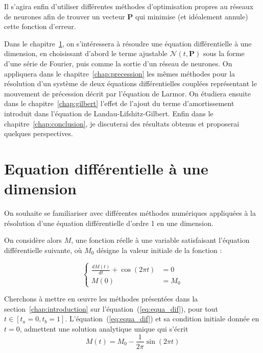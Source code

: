 \documentclass[12pt]{report}
\begin{document}
Il s'agira enfin d'utiliser différentes méthodes d'optimisation propres au réseaux de neurones afin de trouver un vecteur $\bm P$ qui minimise (et idéalement annule) cette fonction d'erreur.

Dans le chapitre~\ref{chap:ode_1}, on s'intéressera à résoudre une équation différentielle à une dimension, en choisissant d'abord le terme ajustable $\mathcal{N}(t,\bm{P})$ sous la forme d'une série de Fourier, puis comme la sortie d'un réseau de neurones.
On appliquera dans le chapitre~\ref{chap:precession} les mêmes méthodes pour la résolution d'un système de deux équations différentielles couplées représentant le mouvement de précession décrit par l'équation de Larmor.
On étudiera ensuite dans le chapitre~\ref{chap:gilbert} l'effet de l'ajout du terme d'amortissement introduit dans l'équation de Landau-Lifshitz-Gilbert.
Enfin dans le chapitre~\ref{chap:conclusion}, je discuterai des résultats obtenus et proposerai quelques perspectives.

\chapter{Equation différentielle à une dimension}
\label{chap:ode_1}

On souhaite se familiariser avec différentes méthodes numériques appliquées à la résolution d'une équation différentielle d'ordre 1 en une dimension.

On considère alors $M$, une fonction réelle à une variable satisfaisant l'équation différentielle suivante, où $M_0$ désigne la valeur initiale de la fonction :

\begin{equation}
    \left\{
    \begin{aligned}
        \frac{dM(t)}{dt} + \cos(2\pi t) & = 0\\
        M(0)                            & = M_0
    \end{aligned}
    \right.
    \label{eq:equa_dif}
\end{equation}

Cherchons à mettre en {\oe}uvre les méthodes présentées dans la section~\ref{chap:introduction} sur l'équation~(\ref{eq:equa_dif}), pour tout $t\in [t_a=0,t_b=1]$.
L'équation~(\ref{eq:equa_dif}) et sa condition initiale donnée en $t=0$, admettent une solution analytique unique qui s'écrit
\begin{equation}
    {M}(t) = M_0 - \frac{1}{2\pi}\sin(2\pi t)
    \label{eq:solution_analytique}
\end{equation}
\end{document}
